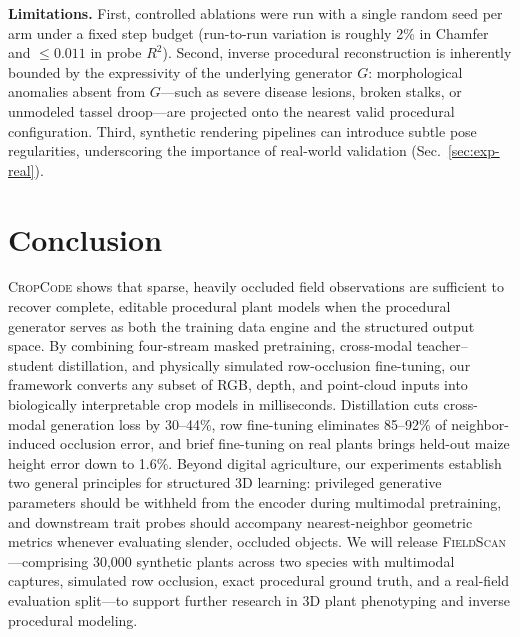 \documentclass[10pt,twocolumn,letterpaper]{article}
\newcommand{\method}{\textsc{CropCode}}
\newcommand{\dataset}{\textsc{FieldScan}}
\begin{document}
\noindent\textbf{Limitations.}
First, controlled ablations were run with a single random seed per arm under a fixed step budget (run-to-run variation is roughly 2\% in Chamfer and $\le 0.011$ in probe $R^2$). Second, inverse procedural reconstruction is inherently bounded by the expressivity of the underlying generator $G$: morphological anomalies absent from $G$---such as severe disease lesions, broken stalks, or unmodeled tassel droop---are projected onto the nearest valid procedural configuration. Third, synthetic rendering pipelines can introduce subtle pose regularities, underscoring the importance of real-world validation (Sec.~\ref{sec:exp-real}).

\section{Conclusion}
\label{sec:conclusion}

\method{} shows that sparse, heavily occluded field observations are sufficient to recover complete, editable procedural plant models when the procedural generator serves as both the training data engine and the structured output space. By combining four-stream masked pretraining, cross-modal teacher--student distillation, and physically simulated row-occlusion fine-tuning, our framework converts any subset of RGB, depth, and point-cloud inputs into biologically interpretable crop models in milliseconds. Distillation cuts cross-modal generation loss by 30--44\%, row fine-tuning eliminates 85--92\% of neighbor-induced occlusion error, and brief fine-tuning on real plants brings held-out maize height error down to 1.6\%. Beyond digital agriculture, our experiments establish two general principles for structured 3D learning: privileged generative parameters should be withheld from the encoder during multimodal pretraining, and downstream trait probes should accompany nearest-neighbor geometric metrics whenever evaluating slender, occluded objects. We will release \dataset{}---comprising 30{,}000 synthetic plants across two species with multimodal captures, simulated row occlusion, exact procedural ground truth, and a real-field evaluation split---to support further research in 3D plant phenotyping and inverse procedural modeling.



\end{document}
